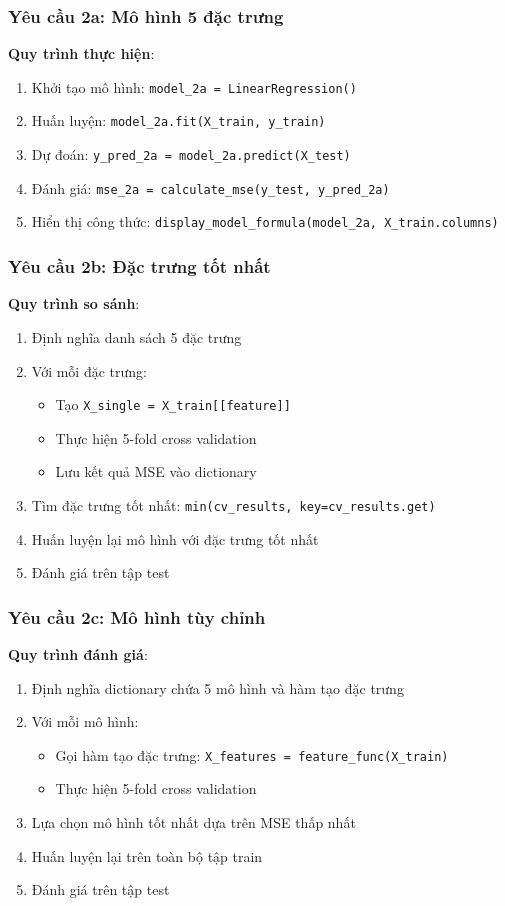 \subsubsection{Yêu cầu 2a: Mô hình 5 đặc trưng}
\textbf{Quy trình thực hiện}:
\begin{enumerate}
	\item Khởi tạo mô hình: \texttt{model\_2a = LinearRegression()}
	\item Huấn luyện: \texttt{model\_2a.fit(X\_train, y\_train)}
	\item Dự đoán: \texttt{y\_pred\_2a = model\_2a.predict(X\_test)}
	\item Đánh giá: \texttt{mse\_2a = calculate\_mse(y\_test, y\_pred\_2a)}
	\item Hiển thị công thức: \texttt{display\_model\_formula(model\_2a, X\_train.columns)}
\end{enumerate}

\subsubsection{Yêu cầu 2b: Đặc trưng tốt nhất}
\textbf{Quy trình so sánh}:
\begin{enumerate}
	\item Định nghĩa danh sách 5 đặc trưng
	\item Với mỗi đặc trưng:
	      \begin{itemize}
		      \item Tạo \texttt{X\_single = X\_train[[feature]]}
		      \item Thực hiện 5-fold cross validation
		      \item Lưu kết quả MSE vào dictionary
	      \end{itemize}
	\item Tìm đặc trưng tốt nhất: \texttt{min(cv\_results, key=cv\_results.get)}
	\item Huấn luyện lại mô hình với đặc trưng tốt nhất
	\item Đánh giá trên tập test
\end{enumerate}

\subsubsection{Yêu cầu 2c: Mô hình tùy chỉnh}
\textbf{Quy trình đánh giá}:
\begin{enumerate}
	\item Định nghĩa dictionary chứa 5 mô hình và hàm tạo đặc trưng
	\item Với mỗi mô hình:
	      \begin{itemize}
		      \item Gọi hàm tạo đặc trưng: \texttt{X\_features = feature\_func(X\_train)}
		      \item Thực hiện 5-fold cross validation
	      \end{itemize}
	\item Lựa chọn mô hình tốt nhất dựa trên MSE thấp nhất
	\item Huấn luyện lại trên toàn bộ tập train
	\item Đánh giá trên tập test
\end{enumerate}